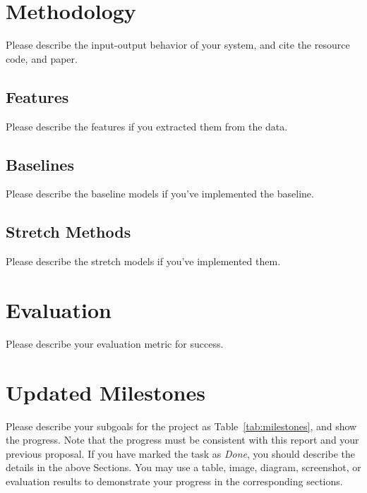 \documentclass[runningheads]{llncs}
\begin{document}
\section{Methodology}
Please describe the input-output behavior of your system, and cite the resource code, and paper.
\subsection{Features}
Please describe the features if you extracted them from the data.

\subsection{Baselines}
Please describe the baseline models if you've implemented the baseline.

\subsection{Stretch Methods}
Please describe the stretch models if you've implemented them.

\section{Evaluation}
Please describe your evaluation metric for success. 

\section{Updated Milestones}
\label{sec:milestones}
Please describe your subgoals for the project as Table~\ref{tab:milestones}, and show the progress. Note that the progress must be consistent with this report and your previous proposal. If you have marked the task as \emph{Done}, you should describe the details in the above Sections. You may use a table, image, diagram, screenshot, or evaluation results to demonstrate your progress in the corresponding sections.
\end{document}
